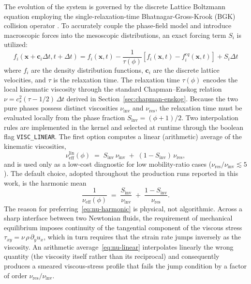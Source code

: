 The evolution of the system is governed by the discrete Lattice Boltzmann equation employing the single-relaxation-time Bhatnagar-Gross-Krook (BGK) collision operator \cite{bhatnagar1954model}.
To accurately couple the phase-field model and introduce macroscopic forces into the mesoscopic distributions, an exact forcing term $S_i$ \cite{guo2002discrete} is utilized:
\begin{equation}
    f_i(\mathbf{x} + \mathbf{c}_i \Delta t, t + \Delta t) = f_i(\mathbf{x}, t) - \frac{1}{\tau(\phi)} \left[ f_i(\mathbf{x}, t) - f_i^{eq}(\mathbf{x}, t) \right] + S_i \Delta t
\end{equation}
where $f_i$ are the density distribution functions, $\mathbf{c}_i$ are the discrete lattice velocities, and $\tau$ is the relaxation time.
The relaxation time $\tau(\phi)$ encodes the local kinematic viscosity through the standard Chapman--Enskog relation $\nu = c_s^{2}(\tau - 1/2)\,\Delta t$ derived in Section~\ref{sec:chapman-enskog}.
Because the two pure phases possess distinct viscosities $\nu_{\mathrm{inv}}$ and $\nu_{\mathrm{res}}$, the relaxation time must be evaluated locally from the phase fraction $S_{\mathrm{inv}} = (\phi+1)/2$.
Two interpolation rules are implemented in the kernel and selected at runtime through the boolean flag \texttt{VISC\_LINEAR}.
The first option computes a linear (arithmetic) average of the kinematic viscosities,
\begin{equation}
\nu_{\mathrm{eff}}^{\mathrm{lin}}(\phi)
\;=\; S_{\mathrm{inv}}\,\nu_{\mathrm{inv}}
\;+\; (1 - S_{\mathrm{inv}})\,\nu_{\mathrm{res}},
\label{eq:nu-linear}
\end{equation}
and is used only as a low-cost diagnostic for low mobility-ratio cases ($\nu_{\mathrm{res}}/\nu_{\mathrm{inv}} \lesssim 5$).
The default choice, adopted throughout the production runs reported in this work, is the harmonic mean
\begin{equation}
\boxed{\;\frac{1}{\nu_{\mathrm{eff}}(\phi)}
\;=\; \frac{S_{\mathrm{inv}}}{\nu_{\mathrm{inv}}}
\;+\; \frac{1 - S_{\mathrm{inv}}}{\nu_{\mathrm{res}}}.\;}
\label{eq:nu-harmonic}
\end{equation}
The reason for preferring~\eqref{eq:nu-harmonic} is physical, not algorithmic.
Across a sharp interface between two Newtonian fluids, the requirement of mechanical equilibrium imposes continuity of the tangential component of the viscous stress $\tau_{xy} = \nu\,\rho\,\partial_y u_x$, which in turn requires that the strain rate jumps inversely as the viscosity.
An arithmetic average~\eqref{eq:nu-linear} interpolates linearly the wrong quantity (the viscosity itself rather than its reciprocal) and consequently produces a smeared viscous-stress profile that fails the jump condition by a factor of order $\nu_{\mathrm{res}}/\nu_{\mathrm{inv}}$.
